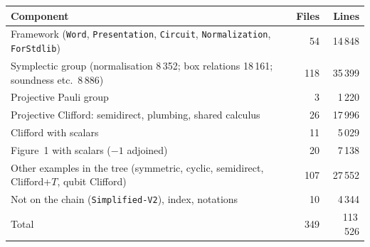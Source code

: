 \begin{center}\begin{minipage}{\textwidth}\centering
{}
\label{tab:stats}
\small
\begin{tabular}{@{}lrr@{}}
\toprule
Component & Files & Lines \\
\midrule
Framework (\texttt{Word}, \texttt{Presentation}, \texttt{Circuit}, \texttt{Normalization}, \texttt{ForStdlib}) & 54 & 14\,848 \\
Symplectic group (normalisation 8\,352; box relations 18\,161; soundness etc.\ 8\,886) & 118 & 35\,399 \\
Projective Pauli group & 3 & 1\,220 \\
Projective Clifford: semidirect, plumbing, shared calculus & 26 & 17\,996 \\
Clifford with scalars & 11 & 5\,029 \\
Figure~1 with scalars ($-1$ adjoined) & 20 & 7\,138 \\
\midrule
Other examples in the tree (symmetric, cyclic, semidirect, Clifford+$T$, qubit Clifford) & 107 & 27\,552 \\
Not on the chain (\texttt{Simplified-V2}), index, notations & 10 & 4\,344 \\
\midrule
Total & 349 & 113\,526 \\
\bottomrule
\end{tabular}
\end{minipage}
\end{center}

